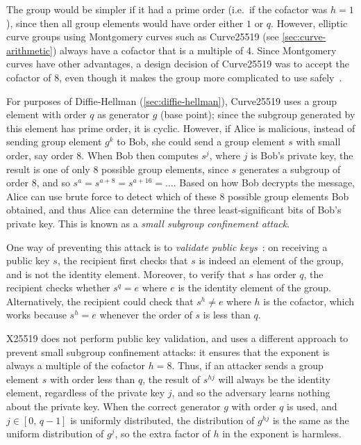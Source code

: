 \documentclass[manuscript]{acmart}
\begin{document}
The group would be simpler if it had a prime order (i.e.\ if the cofactor was $h=1$), since then all group elements would have order either $1$ or $q$.
However, elliptic curve groups using Montgomery curves such as Curve25519 (see \autoref{sec:curve-arithmetic}) always have a cofactor that is a multiple of 4.
Since Montgomery curves have other advantages, a design decision of Curve25519 was to accept the cofactor of 8, even though it makes the group more complicated to use safely~\cite{Hamburg:2015}.

For purposes of Diffie-Hellman (\autoref{sec:diffie-hellman}), Curve25519 uses a group element with order $q$ as generator $g$ (base point); since the subgroup generated by this element has prime order, it is cyclic.
However, if Alice is malicious, instead of sending group element $g^k$ to Bob, she could send a group element $s$ with small order, say order 8.
When Bob then computes $s^j$, where $j$ is Bob's private key, the result is one of only 8 possible group elements, since $s$ generates a subgroup of order 8, and so $s^a = s^{a+8} = s^{a+16} = \dots$.
Based on how Bob decrypts the message, Alice can use brute force to detect which of these 8 possible group elements Bob obtained, and thus Alice can determine the three least-significant bits of Bob's private key.
This is known as a \emph{small subgroup confinement attack}.

One way of preventing this attack is to \emph{validate public keys}~\cite{Antipa:2003}: on receiving a public key $s$, the recipient first checks that $s$ is indeed an element of the group, and is not the identity element.
Moreover, to verify that $s$ has order $q$, the recipient checks whether $s^q = e$ where $e$ is the identity element of the group.
Alternatively, the recipient could check that $s^h \ne e$ where $h$ is the cofactor, which works because $s^h = e$ whenever the order of $s$ is less than $q$.

X25519 does not perform public key validation, and uses a different approach to prevent small subgroup confinement attacks: it ensures that the exponent is always a multiple of the cofactor $h=8$.
Thus, if an attacker sends a group element $s$ with order less than $q$, the result of $s^{hj}$ will always be the identity element, regardless of the private key $j$, and so the adversary learns nothing about the private key.
When the correct generator $g$ with order $q$ is used, and $j \in [0,\, q-1]$ is uniformly distributed, the distribution of $g^{hj}$ is the same as the uniform distribution of $g^j$, so the extra factor of $h$ in the exponent is harmless.
\end{document}
